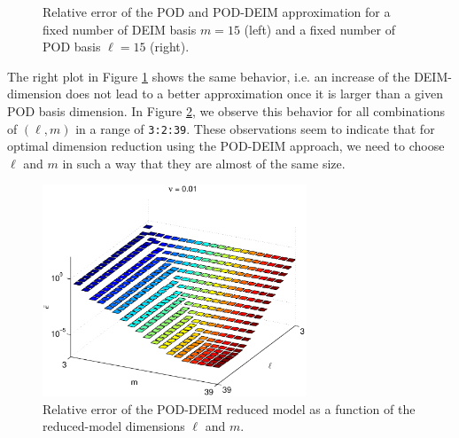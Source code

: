 \begin{figure}[H]
  \centering
  \hfill
  \hfill
  \caption{Relative error of the POD and POD-DEIM approximation for a fixed number of DEIM basis $m = 15$ (left) and a fixed number of POD basis $\ell = 15$ (right).}\label{relErr}
\end{figure}
The right plot in Figure \ref{relErr} shows the same behavior, i.e. an increase of the DEIM-dimension does not lead to a better approximation once it is larger than a given POD basis dimension. In Figure \ref{relErrml}, we observe this behavior for all combinations of $(\ell,m)$ in a range of \texttt{3:2:39}. These observations seem to indicate that for optimal dimension reduction using the POD-DEIM approach, we need to choose $\ell$ and $m$ in such a way that they are almost of the same size.
\begin{figure}[H]
  \centering
\includegraphics[width=0.7\textwidth]{plots/err_lm_NEW}
  \caption{Relative error of the POD-DEIM reduced model as a function of the reduced-model dimensions $\ell$ and $m$.}\label{relErrml}
\end{figure}

